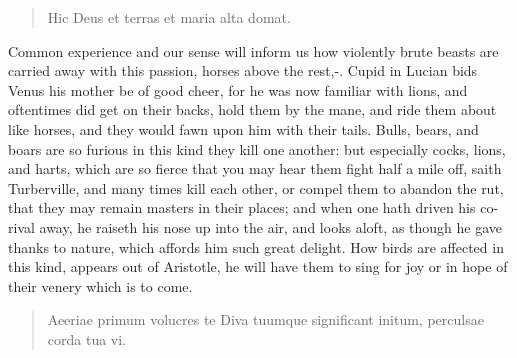 \begin{latin}
\begin{verse}%
Hic Deus et terras et maria alta domat.
\end{verse}%
\end{latin}

Common experience and our sense will inform us how violently brute
beasts are carried away with this passion, horses above the rest,-. Cupid in Lucian bids Venus his mother be of
good cheer, for he was now familiar with lions, and oftentimes did get
on their backs, hold them by the mane, and ride them about like horses,
and they would fawn upon him with their tails. Bulls, bears, and boars
are so furious in this kind they kill one another: but especially
cocks,  lions, and harts, which are so fierce that you may hear
them fight half a mile off, saith Turberville, and many times
kill each other, or compel them to abandon the rut, that they may
remain masters in their places; and when one hath driven his co-rival
away, he raiseth his nose up into the air, and looks aloft, as though
he gave thanks to nature, which affords him such great delight. How
birds are affected in this kind, appears out of Aristotle, he will have
them to sing  for joy or in hope of their venery
which is to come.

\begin{latin}
\begin{verse}%
Aeeriae primum volucres te Diva tuumque
significant initum, perculsae corda tua vi.
\end{verse}%
\end{latin}

